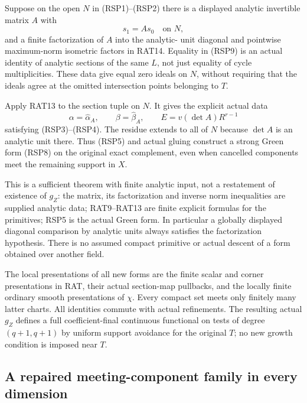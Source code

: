Suppose on the open $N$ in (RSP1)--(RSP2) there is a
displayed analytic invertible matrix $A$ with
\[
                             s_1=A s_0\quad\text{on }N,
 \tag{RSP9}
\]
and a finite factorization of $A$ into the analytic-
unit diagonal and pointwise maximum-norm isometric
factors in RAT14.  Equality in (RSP9) is an actual
identity of analytic sections of the same $L$,
not just equality of cycle multiplicities.  These
data give equal zero ideals on $N$, without requiring
that the ideals agree at the omitted intersection
points belonging to $T$.

Apply RAT13 to the section tuple on $N$.  It gives
the explicit actual data
\[
 \alpha=\widehat\alpha_A,\qquad
 \beta=\widehat\beta_A,\qquad
                      E=v(\det A)R^{r-1}
 \tag{RSP10}
\]
satisfying (RSP3)--(RSP4).  The residue extends to
all of $N$ because $\det A$ is an analytic unit
there.  Thus (RSP5) and actual gluing construct a
strong Green form (RSP8) on the original exact
complement, even when cancelled components meet
the remaining support in $X$.

This is a sufficient theorem with finite analytic
input, not a restatement of existence of $g_Z$:
the matrix, its factorization and inverse norm
inequalities are supplied analytic data; RAT9--RAT13
are finite explicit formulas for the primitives;
RSP5 is the actual Green form.  In particular a
globally displayed diagonal comparison by analytic
units always satisfies the factorization hypothesis.
There is no assumed compact primitive or actual
descent of a form obtained over another field.

The local presentations of all new forms are the
finite scalar and corner presentations in RAT,
their actual section-map pullbacks, and the
locally finite ordinary smooth presentations of
$\chi$.  Every compact set meets only finitely
many latter charts.  All identities commute with
actual refinements.  The resulting actual $g_Z$
defines a full coefficient-final continuous
functional on tests of degree $(q+1,q+1)$ by
uniform support avoidance for the original $T$;
no new growth condition is imposed near $T$.

\subsection{A repaired meeting-component family in every dimension}

